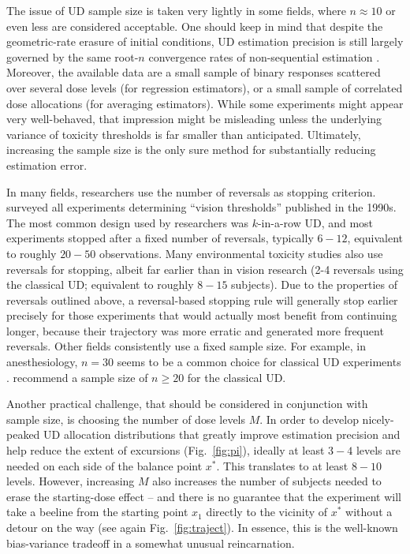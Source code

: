 The issue of UD sample size is taken very lightly in some fields, where $n\approx 10$ or even less are considered acceptable. One should keep in mind that despite the geometric-rate erasure of initial conditions, UD estimation precision is still largely governed by the same root-$n$ convergence rates of non-sequential estimation \citep[Section~1.2]{Oron07} . Moreover, the available data are a small sample of binary responses scattered over several dose levels (for regression estimators), or a small sample of correlated dose allocations (for averaging estimators). While some experiments might appear very well-behaved, that impression might be misleading unless the underlying variance of toxicity thresholds is far smaller than anticipated. Ultimately, increasing the sample size is the only sure method for substantially reducing estimation error.

In many fields, researchers use the number of reversals  as stopping criterion. \cite{Garc:Pere:Forc:1998} surveyed all experiments determining ``vision thresholds'' published in the 1990s. The most common design used by researchers was $k$-in-a-row UD, and most experiments stopped after a fixed number of reversals, typically $6-12$, equivalent to roughly $20-50$ observations. Many environmental toxicity studies also use reversals for stopping, albeit far earlier than in vision research (2-4 reversals using the classical UD; equivalent to roughly $8-15$ subjects). Due to the properties of reversals outlined above, a reversal-based stopping rule will generally stop earlier precisely for those experiments that would actually most benefit from continuing longer, because their trajectory was more erratic and generated more frequent reversals. Other fields consistently use a fixed sample size. For example, in anesthesiology, $n=30$ seems to be a common choice for classical UD experiments \citep{Capo:Parp:Lyon:Colu:Cell:Mini:2001,Camo:Capo:Lyon:Colu:Epid:2004}. \cite{Pace:styl:tutor:2007} recommend a sample size of $n\geq 20$ for the classical UD.

Another practical challenge, that should be considered in conjunction with sample size, is choosing the number of dose levels $M$. In order to develop nicely-peaked UD allocation distributions that greatly improve estimation precision and help reduce the extent of excursions (Fig.~\ref{fig:pi}), ideally at least $3-4$ levels are needed on each side of the balance point $x^*$. This translates to at least $8-10$ levels. However, increasing $M$ also increases the number of subjects needed to erase the starting-dose effect -- and there is no guarantee that the experiment will take a beeline from the starting point $x_1$ directly to the vicinity of $x^*$ without a detour on the way (see again Fig.~\ref{fig:traject}).  In essence, this is the well-known bias-variance tradeoff in a somewhat unusual reincarnation.


